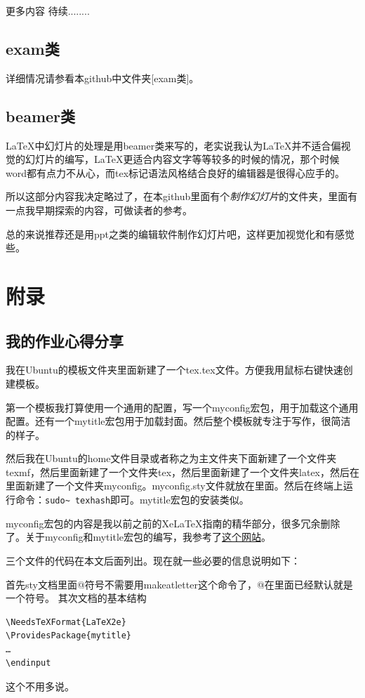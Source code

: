 \documentclass[11pt,oneside]{book}
\begin{document}
更多内容 待续........

\chapter{exam类}
详细情况请参看本github中文件夹[exam类]。

\chapter{beamer类}
\LaTeX 中幻灯片的处理是用beamer类来写的，老实说我认为\LaTeX 并不适合偏视觉的幻灯片的编写，\LaTeX 更适合内容文字等等较多的时候的情况，那个时候 word都有点力不从心，而tex标记语法风格结合良好的编辑器是很得心应手的。

所以这部分内容我决定略过了，在本github里面有个\textit{制作幻灯片}的文件夹，里面有一点我早期探索的内容，可做读者的参考。

总的来说推荐还是用ppt之类的编辑软件制作幻灯片吧，这样更加视觉化和有感觉些。








\appendix
\part{附录}
\chapter{我的作业心得分享}
我在Ubuntu的模板文件夹里面新建了一个tex.tex文件。方便我用鼠标右键快速创建模板。

第一个模板我打算使用一个通用的配置，写一个myconfig宏包，用于加载这个通用配置。还有一个mytitle宏包用于加载封面。然后整个模板就专注于写作，很简洁的样子。

然后我在Ubuntu的home文件目录或者称之为主文件夹下面新建了一个文件夹texmf，然后里面新建了一个文件夹tex，然后里面新建了一个文件夹latex，然后在里面新建了一个文件夹myconfig。myconfig.sty文件就放在里面。然后在终端上运行命令：\verb+sudo~ texhash+即可。mytitle宏包的安装类似。

myconfig宏包的内容是我以前之前的XeLaTeX指南的精华部分，很多冗余删除了。关于myconfig和mytitle宏包的编写，我参考了\href{http://tex.stackexchange.com/questions/70166/create-a-function-that-generates-a-title-page}{这个网站}。

三个文件的代码在本文后面列出。现在就一些必要的信息说明如下：

首先sty文档里面@符号不需要用makeatletter这个命令了，@在里面已经默认就是一个符号。
其次文档的基本结构
\begin{Verbatim}
\NeedsTeXFormat{LaTeX2e}
\ProvidesPackage{mytitle}
…
\endinput
\end{Verbatim}
这个不用多说。
\end{document}
